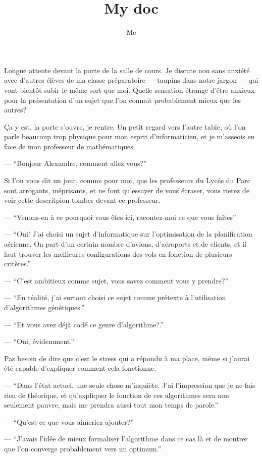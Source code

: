 \documentclass[letterpaper, 12pt]{article} %
\title{My doc}
\author{Me}
\begin{document}
  \doublespacing{}

{\vspace{0pt}
Longue attente devant la porte de la salle de cours. 
Je discute non sans anxiété avec d'autres élèves de ma classe préparatoire --- taupins dans notre jargon --- qui vont bientôt subir le même sort que moi.
Quelle sensation étrange d'être anxieux pour la présentation d'un sujet que l'on connait probablement mieux que les autres?

Ça y est, la porte s'ouvre, je rentre. Un petit regard vers l'autre table, où l'on parle beaucoup trop physique pour mon esprit d'informaticien, et je m'asseois en face de mon professeur de mathématiques.

--- ``Bonjour Alexandre, comment allez vous?''

Si l'on vous dit un jour, comme pour moi, que les professeurs du Lycée du Parc sont arrogants, méprisants, et ne font qu'essayer de vous écraser, vous rierez de voir cette descritpion tomber devant ce professeur.


--- ``Venons-en à ce pourquoi vous êtes ici, racontez-moi ce que vous faîtes''

--- ``Oui! J'ai choisi un sujet d'informatique sur l'optimisation de la planification aérienne. On part d'un certain nombre d'avions, d'aéroports et de clients, et il faut trouver les meilleures configurations des vols en fonction de plusieurs critères.''

--- ``C'est ambitieux comme sujet, vous savez comment vous y prendre?'' %

--- ``En réalité, j'ai surtout choisi ce sujet comme prétexte à l'utilisation d'algorithmes génétiques.''

--- ``Et vous avez déjà codé ce genre d'algorithme?.''

--- ``Oui, évidemment.''

Pas besoin de dire que c'est le stress qui a répondu à ma place, même si j'aurai été capable d'expliquer comment cela fonctionne. 

--- ``Dans l'état actuel, une seule chose m'inquiète. 
		J'ai l'impression que je ne fais rien de théorique, et qu'expliquer le fonction de ces algorithmes sera non seulement pauvre, mais me prendra aussi tout mon temps de parole.''

--- ``Qu'est-ce que vous aimeriez ajouter?''

--- ``J'avais l'idée de mieux formaliser l'algorithme dans ce cas là et de montrer que l'on converge probablement vers un optimum.''

}
\end{document}
